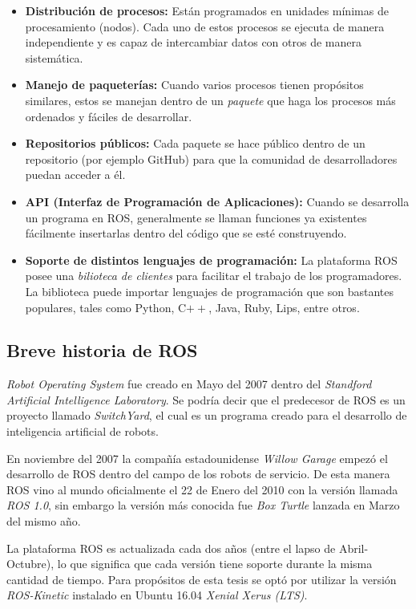\begin{itemize}
\item \textbf{Distribución de procesos:}
Están programados en unidades mínimas de procesamiento (nodos). Cada uno de estos procesos se ejecuta de manera independiente y es capaz de intercambiar datos con otros de manera sistemática.  
\item \textbf{Manejo de paqueterías:}
Cuando varios procesos tienen propósitos similares, estos se manejan dentro de un \textit{paquete} que haga los procesos más ordenados y fáciles de desarrollar.
\item \textbf{Repositorios públicos:}
Cada paquete se hace público dentro de un repositorio (por ejemplo GitHub) para que la comunidad de desarrolladores puedan acceder a él. 
\item \textbf{API (Interfaz de Programación de Aplicaciones):}
Cuando se desarrolla un programa en ROS, generalmente se llaman funciones ya existentes fácilmente insertarlas dentro del código que se esté construyendo.
\item \textbf{Soporte de distintos lenguajes de programación:}
La plataforma ROS posee una \textit{bilioteca de clientes} para facilitar el trabajo de los programadores. La biblioteca puede importar lenguajes de programación que son bastantes populares, tales como Python, C$++$, Java, Ruby, Lips, entre otros.
\end{itemize}
		\subsection*{Breve historia de ROS}
\textit{Robot Operating System} fue creado en Mayo del 2007 dentro del \textit{Standford Artificial Intelligence Laboratory}. Se podría decir que el predecesor de ROS es un proyecto llamado \textit{SwitchYard}, el cual es un programa creado para el desarrollo de inteligencia artificial de robots.

En noviembre del 2007 la compañía estadounidense \textit{Willow Garage} empezó el desarrollo de ROS dentro del campo de los robots de servicio. De esta manera ROS vino al mundo oficialmente el 22 de Enero del 2010 con la versión llamada \textit{ROS 1.0}, sin embargo la versión más conocida fue \textit{Box Turtle} lanzada en Marzo del mismo año.

La plataforma ROS es actualizada cada dos años (entre el lapso de Abril-Octubre), lo que significa que cada versión tiene soporte durante la misma cantidad de tiempo. Para propósitos de esta tesis se optó por utilizar la versión \textit{ROS-Kinetic} instalado en Ubuntu 16.04 \textit{Xenial Xerus (LTS)}.
